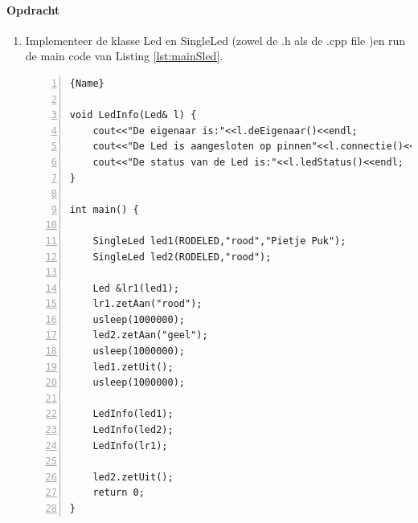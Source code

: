 \paragraph{Opdracht} 
\begin{enumerate}[label=(\alph*)]
\item
Implementeer de klasse Led en SingleLed (zowel de .h als de .cpp file )en run de main code van Listing \ref{lst:mainSled}.

\begin{lstlisting}[caption=main functie om de klasse SingleLed te testen. ,frame=trbl,firstnumber=1,numbers=left,label={lst:mainSled}]{Name}

void LedInfo(Led& l) {
	cout<<"De eigenaar is:"<<l.deEigenaar()<<endl;
	cout<<"De Led is aangesloten op pinnen"<<l.connectie()<<endl;
	cout<<"De status van de Led is:"<<l.ledStatus()<<endl;
}

int main() {
	
	SingleLed led1(RODELED,"rood","Pietje Puk");
	SingleLed led2(RODELED,"rood");
	
	Led &lr1(led1);
	lr1.zetAan("rood");
	usleep(1000000);
	led2.zetAan("geel"); 
	usleep(1000000);
	led1.zetUit();
	usleep(1000000);
	
	LedInfo(led1);
	LedInfo(led2);
	LedInfo(lr1);
	
	led2.zetUit();
	return 0;
}

\end{lstlisting}


\end{enumerate}
